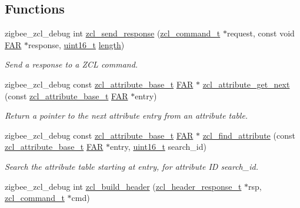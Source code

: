 \subsection*{Functions}
\begin{DoxyCompactItemize}
\item 
zigbee\+\_\+zcl\+\_\+debug int \hyperlink{group__zcl_ga947f6103f6bbe716ddeacbaed65e3ce3}{zcl\+\_\+send\+\_\+response} (\hyperlink{structzcl__command__t}{zcl\+\_\+command\+\_\+t} $\ast$request, const void \hyperlink{group__hal_gaef060b3456fdcc093a7210a762d5f2ed}{F\+AR} $\ast$response, \hyperlink{group__hal__dos_ga5a8b2dc9e45a9ee81a94ef304fb62505}{uint16\+\_\+t} \hyperlink{group__zdo_gab2b3adeb2a67e656ff030b56727fd0ac}{length})
\begin{DoxyCompactList}\small\item\em Send a response to a Z\+CL command. \end{DoxyCompactList}\item 
zigbee\+\_\+zcl\+\_\+debug const \hyperlink{structzcl__attribute__base__t}{zcl\+\_\+attribute\+\_\+base\+\_\+t} \hyperlink{group__hal_gaef060b3456fdcc093a7210a762d5f2ed}{F\+AR} $\ast$ \hyperlink{group__zcl_ga66d9c3c646422e71fed6c94d67c14fdd}{zcl\+\_\+attribute\+\_\+get\+\_\+next} (const \hyperlink{structzcl__attribute__base__t}{zcl\+\_\+attribute\+\_\+base\+\_\+t} \hyperlink{group__hal_gaef060b3456fdcc093a7210a762d5f2ed}{F\+AR} $\ast$entry)
\begin{DoxyCompactList}\small\item\em Return a pointer to the next attribute entry from an attribute table. \end{DoxyCompactList}\item 
zigbee\+\_\+zcl\+\_\+debug const \hyperlink{structzcl__attribute__base__t}{zcl\+\_\+attribute\+\_\+base\+\_\+t} \hyperlink{group__hal_gaef060b3456fdcc093a7210a762d5f2ed}{F\+AR} $\ast$ \hyperlink{group__zcl_ga00ac8dd36cad01d9479a84c296380f40}{zcl\+\_\+find\+\_\+attribute} (const \hyperlink{structzcl__attribute__base__t}{zcl\+\_\+attribute\+\_\+base\+\_\+t} \hyperlink{group__hal_gaef060b3456fdcc093a7210a762d5f2ed}{F\+AR} $\ast$entry, \hyperlink{group__hal__dos_ga5a8b2dc9e45a9ee81a94ef304fb62505}{uint16\+\_\+t} search\+\_\+id)
\begin{DoxyCompactList}\small\item\em Search the attribute table starting at {\ttfamily entry}, for attribute ID {\ttfamily search\+\_\+id}. \end{DoxyCompactList}\item 
zigbee\+\_\+zcl\+\_\+debug int \hyperlink{group__zcl_ga592c970c1f0bda49f1c618d2895dbc6d}{zcl\+\_\+build\+\_\+header} (\hyperlink{group__zcl_gaeac1f6671916dd0ad92b271080ec272a}{zcl\+\_\+header\+\_\+response\+\_\+t} $\ast$rsp, \hyperlink{structzcl__command__t}{zcl\+\_\+command\+\_\+t} $\ast$cmd)

\end{DoxyCompactItemize}
